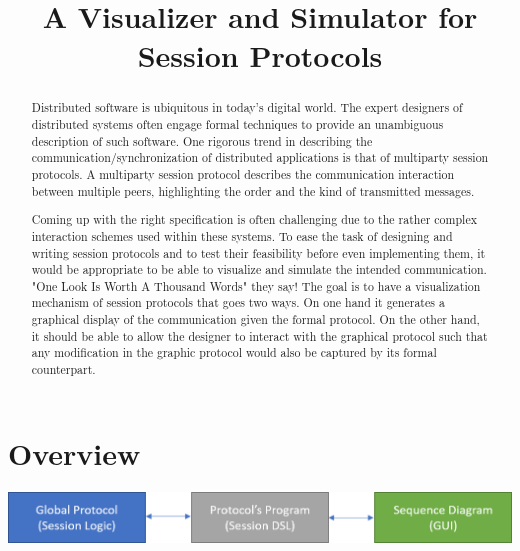\documentclass[acmsmall,10pt,review,anonymous]{acmart}\settopmatter{printfolios=true}
\begin{document}
\captionsetup[figure]{labelfont=bf,textfont=normalfont,singlelinecheck=on}


\title{A Visualizer and Simulator for Session Protocols}


\author{}
\affiliation{}


\begin{abstract}
Distributed software is ubiquitous in today’s digital world. The expert designers of distributed systems often engage formal techniques to provide an unambiguous description of such software. One rigorous trend in describing the communication/synchronization of distributed applications is that of multiparty session protocols. A multiparty session protocol describes the communication interaction between multiple peers, highlighting the order and the kind of transmitted messages.

Coming up with the right specification is often challenging due to the rather complex interaction schemes used within these systems. To ease the task of designing and writing session protocols and to test their feasibility before even implementing them, it would be appropriate to be able to visualize and simulate the intended communication. "One Look Is Worth A Thousand Words" they say! The goal is to have a visualization mechanism of session protocols that goes two ways. On one hand it generates a graphical display of the communication given the formal protocol. On the other hand, it should be able to allow the designer to interact with the graphical protocol such that any modification in the graphic protocol would also be captured by its formal counterpart.

\end{abstract}

\maketitle





\section{Overview}

\begin{center}
\includegraphics[scale=0.6]{overview.png}
\end{center}
\end{document}
